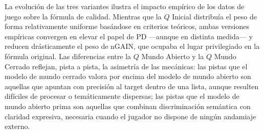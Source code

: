La evolución de las tres variantes ilustra el impacto empírico de los datos de juego sobre la fórmula de calidad. Mientras que la $Q$ Inicial distribuía el peso de forma relativamente uniforme basándose en criterios teóricos, ambas versiones empíricas convergen en elevar el papel de PD —aunque en distinta medida— y reducen drásticamente el peso de nGAIN, que ocupaba el lugar privilegiado en la fórmula original. Las diferencias entre la $Q$ Mundo Abierto y la $Q$ Mundo Cerrado reflejan, pista a pista, la asimetría de las mecánicas: las pistas que el modelo de mundo cerrado valora por encima del modelo de mundo abierto son aquellas que apuntan con precisión al target dentro de una lista, aunque resulten difíciles de procesar o temáticamente dispersas; las pistas que el modelo de mundo abierto prima son aquellas que combinan discriminación semántica con claridad expresiva, necesaria cuando el jugador no dispone de ningún andamiaje externo.
